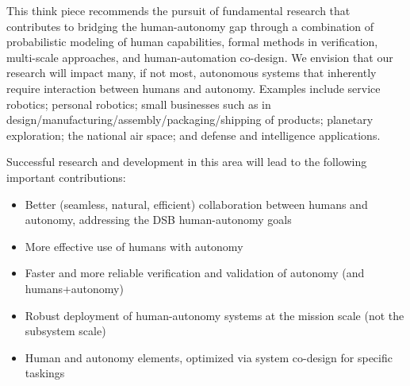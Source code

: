 This think piece recommends the pursuit of fundamental research that contributes to bridging the human-autonomy gap through a combination of probabilistic modeling of human capabilities, formal methods in verification, multi-scale approaches, and human-automation co-design. We envision that our research will impact many, if not most, autonomous systems that inherently require interaction between humans and autonomy.  Examples include service robotics; personal robotics; small businesses such as in design/manufacturing/assembly/packaging/shipping of products; planetary exploration; the national air space; and defense and intelligence applications. 


Successful research and development in this area will lead to the following important contributions:\vspace*{-0.1 in}
\begin{itemize}
\item Better (seamless, natural, efficient) collaboration between humans and autonomy, addressing the DSB human-autonomy goals\vspace*{-0.1 in}
\item More effective use of humans with autonomy\vspace*{-0.1 in}
\item Faster and more reliable verification and validation of autonomy (and humans+autonomy)\vspace*{-0.1 in}
\item Robust deployment of human-autonomy systems at the mission scale (not the subsystem scale)\vspace*{-0.1 in}
\item Human and autonomy elements, optimized via system co-design for specific taskings\vspace*{-0.1 in}
\end{itemize}




